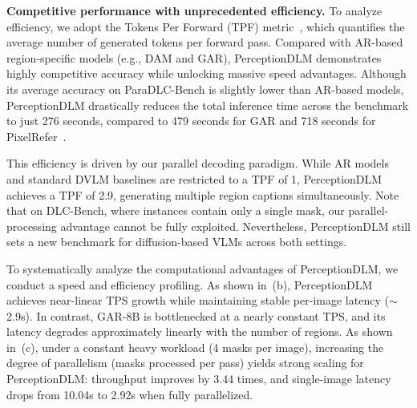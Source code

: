\noindent
\textbf{Competitive performance with unprecedented efficiency.}
To analyze efficiency, we adopt the Tokens Per Forward (TPF) metric~\citep{qian2026d3llm}, which quantifies the average number of generated tokens per forward pass. Compared with AR-based region-specific models (e.g., DAM and GAR), PerceptionDLM demonstrates highly competitive accuracy while unlocking massive speed advantages. Although its average accuracy on ParaDLC-Bench is slightly lower than AR-based models, PerceptionDLM drastically reduces the total inference time across the benchmark to just 276 seconds, compared to 479 seconds for GAR and 718 seconds for PixelRefer~\citep{yuan2025pixelrefer}. 

This efficiency is driven by our parallel decoding paradigm. While AR models and standard DVLM baselines are restricted to a TPF of 1, PerceptionDLM achieves a TPF of 2.9, generating multiple region captions simultaneously. Note that on DLC-Bench, where instances contain only a single mask, our parallel-processing advantage cannot be fully exploited. Nevertheless, PerceptionDLM still sets a new benchmark for diffusion-based VLMs across both settings.


To systematically analyze the computational advantages of PerceptionDLM, we conduct a speed and efficiency profiling.
As shown in~(b), PerceptionDLM achieves near-linear TPS growth while maintaining stable per-image latency ($\sim$2.9s).
%
In contrast, GAR-8B is bottlenecked at a nearly constant TPS, and its latency degrades approximately linearly with the number of regions. 
%
As shown in~(c), under a constant heavy workload (4 masks per image), increasing the degree of parallelism (masks processed per pass) yields strong scaling for PerceptionDLM: throughput improves by 3.44 times, and single-image latency drops from 10.04s to 2.92s when fully parallelized.